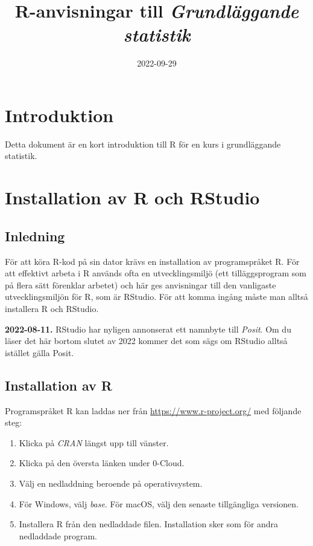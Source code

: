 \documentclass[
]{book}
\title{R-anvisningar till \emph{Grundläggande statistik}}
\author{}
\date{\vspace{-2.5em}2022-09-29}
\providecommand{\tightlist}{%
  \setlength{\itemsep}{0pt}\setlength{\parskip}{0pt}}
\theoremstyle{definition}
\theoremstyle{definition}
\theoremstyle{definition}
\theoremstyle{definition}
\theoremstyle{remark}
\begin{document}
\maketitle

{
\setcounter{tocdepth}{1}
\tableofcontents
}
\hypertarget{introduktion}{%
\chapter*{Introduktion}\label{introduktion}}

Detta dokument är en kort introduktion till R för en kurs i grundläggande statistik.

\hypertarget{installation-av-r-och-rstudio}{%
\chapter*{Installation av R och RStudio}\label{installation-av-r-och-rstudio}}

\hypertarget{inledning}{%
\section{Inledning}\label{inledning}}

För att köra R-kod på sin dator krävs en installation av programspråket R. För att effektivt arbeta i R används ofta en utvecklingsmiljö (ett tilläggsprogram som på flera sätt förenklar arbetet) och här ges anvisningar till den vanligaste utvecklingsmiljön för R, som är RStudio. För att komma ingång måste man alltså installera R och RStudio.

\textbf{2022-08-11.} RStudio har nyligen annonserat ett namnbyte till \emph{Posit}. Om du läser det här bortom slutet av 2022 kommer det som sägs om RStudio alltså istället gälla Posit.

\hypertarget{installation-av-r}{%
\section{Installation av R}\label{installation-av-r}}

Programspråket R kan laddas ner från \url{https://www.r-project.org/} med följande steg:

\begin{enumerate}
\def\labelenumi{\arabic{enumi}.}
\tightlist
\item
  Klicka på \emph{CRAN} längst upp till vänster.
\item
  Klicka på den översta länken under 0-Cloud.
\item
  Välj en nedladdning beroende på operativsystem.
\item
  För Windows, välj \emph{base}. För macOS, välj den senaste tillgängliga versionen.
\item
  Installera R från den nedladdade filen. Installation sker som för andra nedladdade program.
\end{enumerate}
\end{document}
